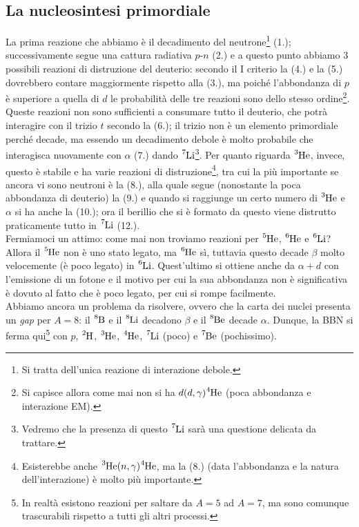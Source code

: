 \subsection{La nucleosintesi primordiale}\label{sec-nuc-prim}
La prima reazione che abbiamo è il decadimento del neutrone\footnote{Si tratta dell'unica reazione di interazione debole.} (1.); successivamente segue una cattura radiativa $p$-$n$ (2.) e a questo punto abbiamo 3 possibili reazioni di distruzione del deuterio: secondo il I criterio la (4.) e la (5.) dovrebbero contare maggiormente rispetto alla (3.), ma poiché l'abbondanza di $p$ è superiore a quella di $d$ le probabilità delle tre reazioni sono dello stesso ordine\footnote{Si capisce allora come mai non si ha $d(d,\gamma)\ce{^4He}$ (poca abbondanza e interazione EM).}. Queste reazioni non sono sufficienti a consumare tutto il deuterio, che potrà interagire con il trizio $t$ secondo la (6.); il trizio non è un elemento primordiale perché decade, ma essendo un decadimento debole è molto probabile che interagisca nuovamente con $\alpha$ (7.) dando $\ce{^7Li}$\footnote{Vedremo che la presenza di questo $\ce{^7Li}$ sarà una questione delicata da trattare.}.
Per quanto riguarda $\ce{^3He}$, invece, questo è stabile e ha varie reazioni di distruzione\footnote{Esisterebbe anche $\ce{^3He}(n,\gamma)\ce{^4He}$, ma la (8.) (data l'abbondanza e la natura dell'interazione) è molto più importante.}, tra cui la più importante se ancora vi sono neutroni è la (8.), alla quale segue (nonostante la poca abbondanza di deuterio) la (9.) e quando si raggiunge un certo numero di $\ce{^3He}$ e $\alpha$ si ha anche la (10.); ora il berillio che si è formato da questo viene distrutto praticamente tutto in $\ce{^7Li}$ (12.).\\
Fermiamoci un attimo: come mai non troviamo reazioni per $\ce{^5He}$, $\ce{^6He}$ e $\ce{^6Li}$? Allora il $\ce{^5He}$ non è uno stato legato, ma $\ce{^6He}$ sì, tuttavia questo decade $\beta$ molto velocemente (è poco legato) in $\ce{^6Li}$. Quest'ultimo si ottiene anche da $\alpha + d$ con l'emissione di un fotone e il motivo per cui la sua abbondanza non è significativa è dovuto al fatto che è poco legato, per cui si rompe facilmente.\\
Abbiamo ancora un problema da risolvere, ovvero che la carta dei nuclei presenta un \textit{gap} per $A=8$: il $\ce{^8B}$ e il $\ce{^8Li}$ decadono $\beta$ e il $\ce{^8Be}$ decade $\alpha$. Dunque, la BBN si ferma qui\footnote{In realtà esistono reazioni per saltare da $A=5$ ad $A=7$, ma sono comunque trascurabili rispetto a tutti gli altri processi.} con $p$, $\ce{^2H}$, $\ce{^3He}$, $\ce{^4He}$, $\ce{^7Li}$ (poco) e $\ce{^7Be}$ (pochissimo).


